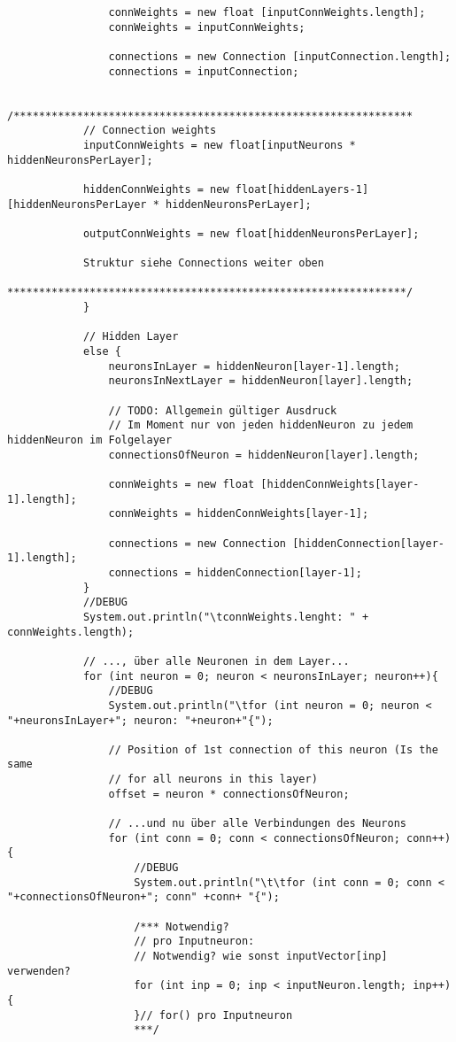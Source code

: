\begin{lstlisting}
				connWeights = new float [inputConnWeights.length];
				connWeights = inputConnWeights;

				connections = new Connection [inputConnection.length];
				connections = inputConnection;
						
			/***************************************************************
			// Connection weights
			inputConnWeights = new float[inputNeurons * hiddenNeuronsPerLayer];
			
			hiddenConnWeights = new float[hiddenLayers-1][hiddenNeuronsPerLayer * hiddenNeuronsPerLayer];

			outputConnWeights = new float[hiddenNeuronsPerLayer];
			
			Struktur siehe Connections weiter oben
			***************************************************************/
			}
			
			// Hidden Layer
			else {
				neuronsInLayer = hiddenNeuron[layer-1].length;
				neuronsInNextLayer = hiddenNeuron[layer].length;
				
				// TODO: Allgemein gültiger Ausdruck
				// Im Moment nur von jeden hiddenNeuron zu jedem hiddenNeuron im Folgelayer
				connectionsOfNeuron = hiddenNeuron[layer].length;
				
				connWeights = new float [hiddenConnWeights[layer-1].length];
				connWeights = hiddenConnWeights[layer-1];

				connections = new Connection [hiddenConnection[layer-1].length];
				connections = hiddenConnection[layer-1];
			}
			//DEBUG
			System.out.println("\tconnWeights.lenght: " + connWeights.length);
			
			// ..., über alle Neuronen in dem Layer...
			for (int neuron = 0; neuron < neuronsInLayer; neuron++){
				//DEBUG
				System.out.println("\tfor (int neuron = 0; neuron < "+neuronsInLayer+"; neuron: "+neuron+"{");
				
				// Position of 1st connection of this neuron (Is the same
				// for all neurons in this layer)
				offset = neuron * connectionsOfNeuron;
			
				// ...und nu über alle Verbindungen des Neurons
				for (int conn = 0; conn < connectionsOfNeuron; conn++){
					//DEBUG
					System.out.println("\t\tfor (int conn = 0; conn < "+connectionsOfNeuron+"; conn" +conn+ "{");
					
					/*** Notwendig?
					// pro Inputneuron:
					// Notwendig? wie sonst inputVector[inp] verwenden?
					for (int inp = 0; inp < inputNeuron.length; inp++){
					}// for() pro Inputneuron
					***/
					

\end{lstlisting}
